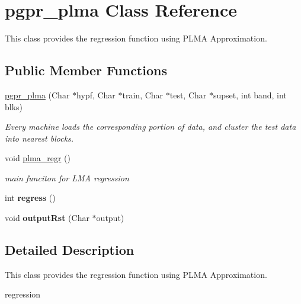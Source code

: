 \hypertarget{classpgpr__plma}{\section{pgpr\+\_\+plma Class Reference}
\label{classpgpr__plma}
}


This class provides the regression function using P\+L\+M\+A Approximation.  


\subsection*{Public Member Functions}
\begin{DoxyCompactItemize}
\item 
\hyperlink{classpgpr__plma_a91e6492d35e220988b68d49cfe851d61}{pgpr\+\_\+plma} (Char $\ast$hypf, Char $\ast$train, Char $\ast$test, Char $\ast$supset, int band, int blks)
\begin{DoxyCompactList}\small\item\em Every machine loads the corresponding portion of data, and cluster the test data into nearest blocks. \end{DoxyCompactList}\item 
void \hyperlink{classpgpr__plma_a52c35beeae947892f4f22145a1d91953}{plma\+\_\+regr} ()
\begin{DoxyCompactList}\small\item\em main funciton for L\+M\+A regression \end{DoxyCompactList}\item 
\hypertarget{classpgpr__plma_a453028ebd8039f0ba8a89af23e5e7f85}{int {\bfseries regress} ()}\label{classpgpr__plma_a453028ebd8039f0ba8a89af23e5e7f85}

\item 
\hypertarget{classpgpr__plma_a4b8bd4f97865f60e90baa88c3ed54b68}{void {\bfseries output\+Rst} (Char $\ast$output)}\label{classpgpr__plma_a4b8bd4f97865f60e90baa88c3ed54b68}

\end{DoxyCompactItemize}


\subsection{Detailed Description}
This class provides the regression function using P\+L\+M\+A Approximation. 

regression 

